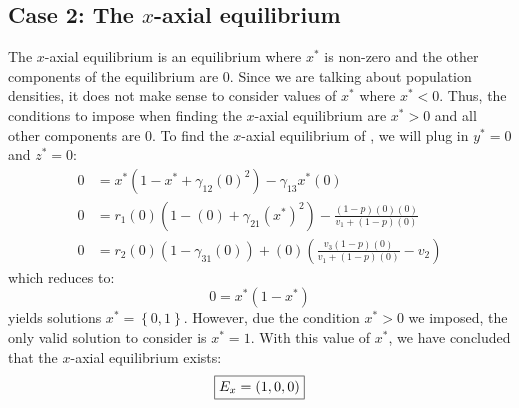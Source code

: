 \subsection{Case 2: The $x$-axial equilibrium}\label{subsec:x_axial_equilibrium}
The $x$-axial equilibrium is an equilibrium where $x^*$ is non-zero and the other components of the equilibrium are 0. Since we are talking about population densities, it does not make sense to consider values of $x^*$ where $x^*<0$. Thus, the conditions to impose when finding the $x$-axial equilibrium are $x^*>0$ and all other components are 0. To find the $x$-axial equilibrium of , we will plug in $y^*=0$ and $z^*=0$:
\begin{align*}
    0 &= x^*\left(1-x^*+\gamma_{12}(0)^2\right)-\gamma_{13}x^*(0)\\
    0 &= r_1(0)\left(1-(0)+\gamma_{21}\left(x^*\right)^2\right)-\frac{\left(1-p\right)(0)(0)}{v_1+\left(1-p\right)(0)}\\
    0 &= r_2(0)\left(1-\gamma_{31}(0)\right)+(0)\left(\frac{v_3\left(1-p\right)(0)}{v_1+\left(1-p\right)(0)}-v_2\right)
\end{align*}
which reduces to:
\begin{equation}
    0 = x^*\left(1-x^*\right)
    \label{eq:4.2}
\end{equation}
 yields solutions $x^*=\left\{0, 1\right\}$. However, due the condition $x^*>0$ we imposed, the only valid solution to consider is $x^*=1$. With this value of $x^*$, we have concluded that the $x$-axial equilibrium exists:
\[
\fbox{$\displaystyle E_x=\left(
1,
0,
0
\right)$}
\]

